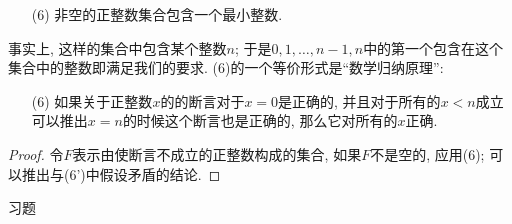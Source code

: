 \documentclass[12pt,a4paper]{book} %
\theoremstyle{remark}
\theoremstyle{example}
\theoremstyle{lemma}
\theoremstyle{corollary}
\numberwithin{theorem}{chapter}
\begin{document}
\begin{enumerate}
\item[(6)] 非空的正整数集合包含一个最小整数.
\end{enumerate}

事实上, 这样的集合中包含某个整数$n$; 于是$0, 1, \ldots, n - 1, n$中的第一个包含在这个集合中的整数即满足我们的要求. (6)的一个等价形式是``数学归纳原理'':

\begin{enumerate}
\item[(6\textquotesingle)] 如果关于正整数$x$的的断言对于$x = 0$是正确的, 并且对于所有的$x < n$成立可以推出$x = n$的时候这个断言也是正确的, 那么它对所有的$x$正确.
\end{enumerate}

\begin{proof}
令$F$表示由使断言不成立的正整数构成的集合, 如果$F$不是空的, 应用(6); 可以推出与(6')中假设矛盾的结论.
\end{proof}

习题
\end{document}
